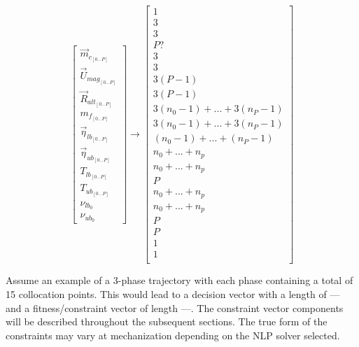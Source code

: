 \begin{multicols}{2}
\begin{equation}
\begin{bmatrix}
\vec{m}_{c_{[0 ... P]}} \\
\vec{U}_{mag_{[0 ... P]}} \\
\vec{R}_{alt_{[0 ... P]}} \\
m_{f_{[0 ... P]}} \\
\vec{\eta}_{lb_{[0 ... P]}} \\
\vec{\eta}_{ub_{[0 ... P]}} \\
T_{lb_{[0 ... P]}} \\
T_{ub_{[0 ... P]}}  \\
\nu_{lb_{0}} \\
\nu_{ub_{0}} 
\end{bmatrix}
\rightarrow
\begin{bmatrix}
1 \\
3 \\
3 \\
P? \\
3 \\
3 \\
3 (P - 1) \\
3 (P - 1) \\
3(n_0-1) + ... + 3(n_P - 1) \\
3(n_0-1) + ... + 3(n_P - 1) \\
(n_0-1) + ... + (n_P - 1) \\
n_0 + ... + n_p \\
n_0 + ... + n_p \\
P \\
n_0 + ... + n_p \\
n_0 + ... + n_p \\
P \\
P \\
1 \\
1 \\
\end{bmatrix}
\end{equation} 
\end{multicols}
Assume an example of a 3-phase trajectory with each phase containing a total of 15 collocation points. This would lead to a decision vector with a length of --- and a fitness/constraint vector of length  ---. The constraint vector components will be described throughout the subsequent sections. The true form of the constraints may vary at mechanization depending on the NLP solver selected.



